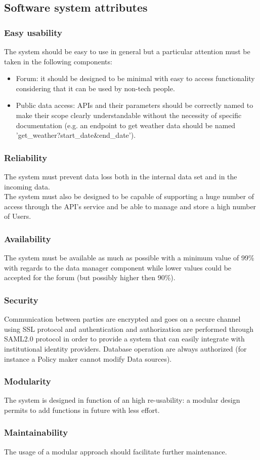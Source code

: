 \subsection{Software system attributes}
\subsubsection{Easy usability}
The system should be easy to use in general but a particular attention must be taken in the following components:
\begin{itemize}
    \item Forum: it should be designed to be minimal with easy to access functionality considering that it can be used by non-tech people.  
    \item Public data access: APIs and their parameters should be correctly named to make their scope clearly understandable without the necessity of specific documentation (e.g. an endpoint to get weather data should be named 'get\_weather?start\_date\&end\_date'). 
\end{itemize}

\subsubsection{Reliability}
The system must prevent data loss both in the internal data set and in the incoming data.\\
The system must also be designed to be capable of supporting a huge number of access through the API's service and be able to manage and store a high number of Users. 

\subsubsection{Availability}
The system must be available as much as possible with a minimum value of 99\% with regards to the data manager component while lower values could be accepted for the forum (but possibly higher then 90\%).

\subsubsection{Security}
Communication between parties are encrypted and goes on a secure channel using SSL protocol and authentication and authorization are performed through SAML2.0 protocol in order to provide a system that can easily integrate with institutional identity providers. Database operation are always authorized (for instance a Policy maker cannot modify Data sources).

\subsubsection{Modularity}
The system is designed in function of an high re-usability: a modular design permits to add functions in future with less effort.

\subsubsection{Maintainability}
The usage of a modular approach should facilitate further maintenance.